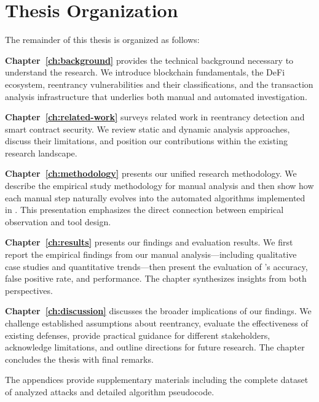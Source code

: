 \section{Thesis Organization}
\label{sec:intro-organization}

The remainder of this thesis is organized as follows:

\textbf{Chapter~\ref{ch:background}} provides the technical background necessary to understand the research. We introduce blockchain fundamentals, the DeFi ecosystem, reentrancy vulnerabilities and their classifications, and the transaction analysis infrastructure that underlies both manual and automated investigation.

\textbf{Chapter~\ref{ch:related-work}} surveys related work in reentrancy detection and smart contract security. We review static and dynamic analysis approaches, discuss their limitations, and position our contributions within the existing research landscape.

\textbf{Chapter~\ref{ch:methodology}} presents our unified research methodology. We describe the empirical study methodology for manual analysis and then show how each manual step naturally evolves into the automated algorithms implemented in \ToolName. This presentation emphasizes the direct connection between empirical observation and tool design.

\textbf{Chapter~\ref{ch:results}} presents our findings and evaluation results. We first report the empirical findings from our manual analysis---including qualitative case studies and quantitative trends---then present the evaluation of \ToolName's accuracy, false positive rate, and performance. The chapter synthesizes insights from both perspectives.

\textbf{Chapter~\ref{ch:discussion}} discusses the broader implications of our findings. We challenge established assumptions about reentrancy, evaluate the effectiveness of existing defenses, provide practical guidance for different stakeholders, acknowledge limitations, and outline directions for future research. The chapter concludes the thesis with final remarks.

The appendices provide supplementary materials including the complete dataset of analyzed attacks and detailed algorithm pseudocode.
